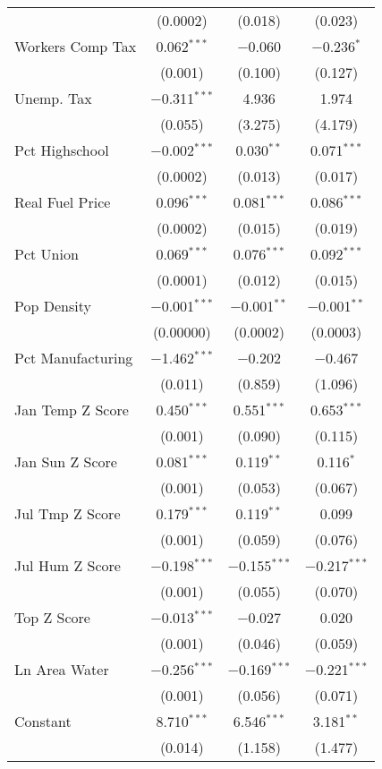 \begin{table}[!htbp]
\begin{tabular}{@{\extracolsep{5pt}}lccc}
  & (0.0002) & (0.018) & (0.023) \\ 
  Workers Comp Tax & 0.062$^{***}$ & $-$0.060 & $-$0.236$^{*}$ \\ 
  & (0.001) & (0.100) & (0.127) \\ 
  Unemp. Tax & $-$0.311$^{***}$ & 4.936 & 1.974 \\ 
  & (0.055) & (3.275) & (4.179) \\ 
  Pct Highschool & $-$0.002$^{***}$ & 0.030$^{**}$ & 0.071$^{***}$ \\ 
  & (0.0002) & (0.013) & (0.017) \\ 
  Real Fuel Price & 0.096$^{***}$ & 0.081$^{***}$ & 0.086$^{***}$ \\ 
  & (0.0002) & (0.015) & (0.019) \\ 
  Pct Union & 0.069$^{***}$ & 0.076$^{***}$ & 0.092$^{***}$ \\ 
  & (0.0001) & (0.012) & (0.015) \\ 
  Pop Density & $-$0.001$^{***}$ & $-$0.001$^{**}$ & $-$0.001$^{**}$ \\ 
  & (0.00000) & (0.0002) & (0.0003) \\ 
  Pct Manufacturing & $-$1.462$^{***}$ & $-$0.202 & $-$0.467 \\ 
  & (0.011) & (0.859) & (1.096) \\ 
  Jan Temp Z Score & 0.450$^{***}$ & 0.551$^{***}$ & 0.653$^{***}$ \\ 
  & (0.001) & (0.090) & (0.115) \\ 
  Jan Sun Z Score & 0.081$^{***}$ & 0.119$^{**}$ & 0.116$^{*}$ \\ 
  & (0.001) & (0.053) & (0.067) \\ 
  Jul Tmp Z Score & 0.179$^{***}$ & 0.119$^{**}$ & 0.099 \\ 
  & (0.001) & (0.059) & (0.076) \\ 
  Jul Hum Z Score & $-$0.198$^{***}$ & $-$0.155$^{***}$ & $-$0.217$^{***}$ \\ 
  & (0.001) & (0.055) & (0.070) \\ 
  Top Z Score & $-$0.013$^{***}$ & $-$0.027 & 0.020 \\ 
  & (0.001) & (0.046) & (0.059) \\ 
  Ln Area Water & $-$0.256$^{***}$ & $-$0.169$^{***}$ & $-$0.221$^{***}$ \\ 
  & (0.001) & (0.056) & (0.071) \\ 
  Constant & 8.710$^{***}$ & 6.546$^{***}$ & 3.181$^{**}$ \\ 
  & (0.014) & (1.158) & (1.477) \\ 

\end{tabular}
\end{table}
